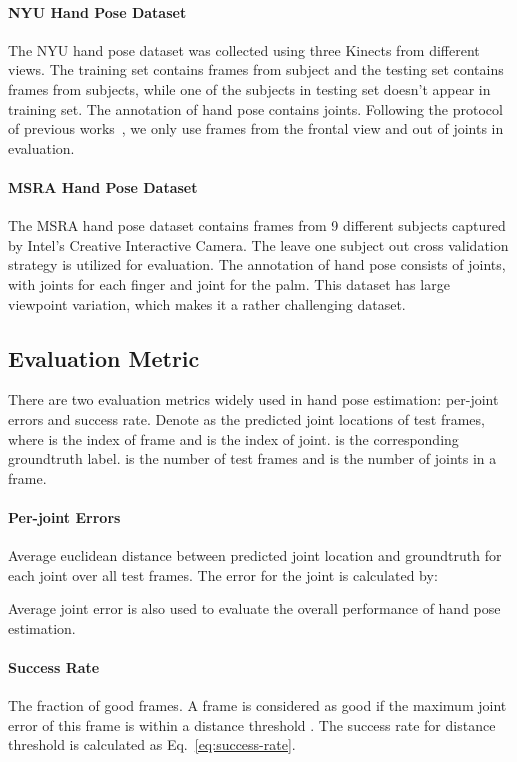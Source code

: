 \documentclass[final, 5p]{elsarticle}
\begin{document}
\paragraph{\textbf{NYU Hand Pose Dataset~\cite{tompson2014real}}} The NYU hand pose dataset was collected using three Kinects from different views. The training set contains  frames from  subject and the testing set contains  frames from  subjects, while one of the subjects in testing set doesn't appear in training set. The annotation of hand pose contains  joints. Following the protocol of previous works~\cite{tompson2014real, oberweger2015hands, oberweger2015training, zhou2016model, guo2017region}, we only use frames from the frontal view and  out of  joints in evaluation.
\paragraph{\textbf{MSRA Hand Pose Dataset~\cite{sun2015cascaded}}} The MSRA hand pose dataset contains  frames from 9 different subjects captured by Intel's Creative Interactive Camera. The leave one subject out cross validation strategy is utilized for evaluation. The annotation of hand pose consists of  joints, with  joints for each finger and  joint for the palm. This dataset has large viewpoint variation, which makes it a rather challenging dataset.

\subsection{Evaluation Metric}
There are two evaluation metrics widely used in hand pose estimation: per-joint errors and success rate. Denote  as the predicted joint locations of test frames, where  is the index of frame and  is the index of joint.  is the corresponding groundtruth label.  is the number of test frames and  is the number of joints in a frame.
\paragraph{\textbf{Per-joint Errors}} Average euclidean distance between predicted joint location and groundtruth for each joint over all test frames. The error for the  joint is calculated by:

Average joint error  is also used to evaluate the overall performance of hand pose estimation.

\paragraph{\textbf{Success Rate}} The fraction of good frames. A frame is considered as good if the maximum joint error of this frame is within a distance threshold . The success rate for distance threshold  is calculated as Eq.~\ref{eq:success-rate}.
\end{document}
